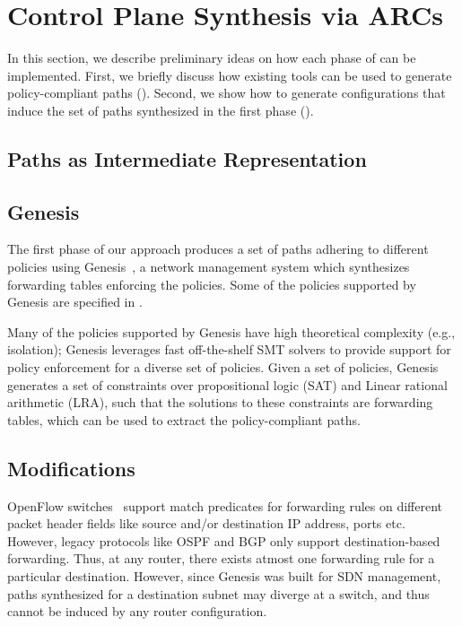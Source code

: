\section{Control Plane Synthesis via ARCs} \label{sec:synthesis}
In this section, we describe preliminary ideas on how each phase of 
 can be implemented.
First, we briefly discuss how existing tools can be used to generate
policy-compliant paths ().
Second, we show how to generate configurations that induce
the set of paths synthesized in the first phase ().

\subsection{Paths as Intermediate Representation} \label{sec:phase1}

\subsection{Genesis}
The first phase of our approach produces a set of paths adhering to
different policies using Genesis~\cite{genesis}, a network management
system which synthesizes forwarding tables enforcing the policies. 
Some of the policies supported by Genesis are specified in 
. 

Many of the policies supported by Genesis have high 
theoretical complexity (e.g., isolation); Genesis 
leverages fast off-the-shelf SMT solvers to provide
support for policy enforcement for a diverse set of policies.
Given a set of policies, Genesis generates a set of constraints 
over propositional logic (SAT) and Linear rational arithmetic (LRA),
such that the solutions to these constraints are forwarding
tables, which can be used to extract the 
policy-compliant paths.

\subsection{Modifications}
OpenFlow switches~\cite{openflow} support match predicates for
forwarding rules on different packet header fields like source
and/or destination IP address, ports etc. However, legacy protocols
like OSPF and BGP only support destination-based forwarding. Thus,
at any router, there exists atmost one forwarding rule for a 
particular destination. However, since Genesis was built for
SDN management, paths synthesized for a destination subnet may
diverge at a switch, and thus cannot be induced by any router
configuration. 

